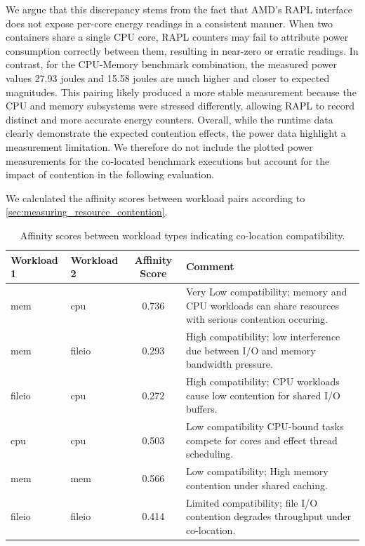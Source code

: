 We argue that this discrepancy stems from the fact that AMD's RAPL interface does not expose per-core energy readings in a consistent manner. When two containers share a single CPU core, RAPL counters may fail to attribute power consumption correctly between them, resulting in near-zero or erratic readings. In contrast, for the CPU-Memory benchmark combination, the measured power values 27.93 joules and 15.58 joules are much higher and closer to expected magnitudes. This pairing likely produced a more stable measurement because the CPU and memory subsystems were stressed differently, allowing RAPL to record distinct and more accurate energy counters.
Overall, while the runtime data clearly demonstrate the expected contention effects, the power data highlight a measurement limitation. We therefore do not include the plotted power measurements for the co-located benchmark executions but account for the impact of contention in the following evaluation.


We calculated the affinity scores between workload pairs according to \ref{sec:measuring_resource_contention}.

\begin{table}[H]
    \centering
    \begin{tabularx}{\textwidth}{l l c X}
        \toprule
        \textbf{Workload 1} & \textbf{Workload 2} & \textbf{Affinity Score} & \textbf{Comment}                                                                                       \\
        \midrule
        mem                 & cpu                 & 0.736                   & Very Low compatibility; memory and CPU workloads can share resources with serious contention occuring. \\
        mem                 & fileio              & 0.293                   & High compatibility; low interference due between I/O and memory bandwidth pressure.                    \\
        fileio              & cpu                 & 0.272                   & High compatibility; CPU workloads cause low contention for shared I/O buffers.                         \\
        cpu                 & cpu                 & 0.503                   & Low compatibility CPU-bound tasks compete for cores and effect thread scheduling.                      \\
        mem                 & mem                 & 0.566                   & Low compatibility; High memory contention under shared caching.                                        \\
        fileio              & fileio              & 0.414                   & Limited compatibility; file I/O contention degrades throughput under co-location.                      \\
        \bottomrule
    \end{tabularx}
    \small
    \caption{Affinity scores between workload types indicating co-location compatibility.}
    \label{tab:affinity_scores}
\end{table}

